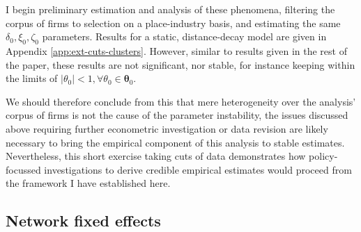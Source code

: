 I begin preliminary estimation and analysis of these phenomena, filtering the corpus of firms
to selection on a place-industry basis, and estimating the same $\delta_0, \xi_0, \zeta_0$
parameters. Results for a static, distance-decay model are given in Appendix \ref{app:ext-cuts-clusters}.
However, similar to results given in the rest of the paper, these results are not significant, nor stable,
for instance keeping within the  limits of $\vert\theta_0\vert<1, \forall
\theta_0\in\boldsymbol\theta_0$.
\par
We should therefore conclude from this that mere heterogeneity over the analysis' corpus of firms
is not the cause of the parameter instability, the issues discussed above requiring further
econometric investigation or data revision are likely necessary to bring the empirical
component of this analysis to stable estimates.
Nevertheless, this short exercise taking cuts of data demonstrates how policy-focussed investigations
to derive credible empirical estimates would proceed from the framework I have established here.

\subsection{Network fixed effects}
\label{ss:ext-nfe}

